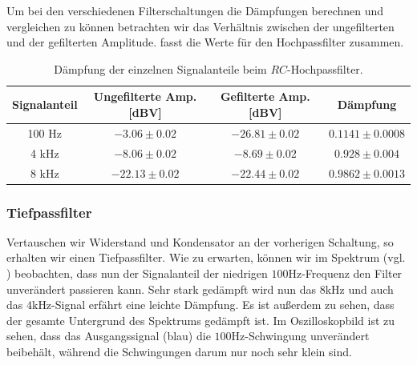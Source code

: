 Um bei den verschiedenen Filterschaltungen die Dämpfungen berechnen und vergleichen zu können betrachten wir das Verhältnis zwischen der ungefilterten und der gefilterten Amplitude.  fasst die Werte für den  Hochpassfilter zusammen.

\begin{table}[H]
  \centering
  \caption{Dämpfung der einzelnen Signalanteile beim $RC$-Hochpassfilter.}
  \vspace*{1em}
  \label{tab:dmpf_hochpass}
  \begin{tabular}{c|c|c|c}
    Signalanteil & Ungefilterte Amp. [dBV] & Gefilterte Amp. [dBV] & Dämpfung\\\hline
    100 Hz & $-3.06 \pm 0.02$ & $-26.81 \pm 0.02$ & $0.1141 \pm 0.0008$\\
    4 kHz & $-8.06 \pm 0.02$ & $-8.69 \pm 0.02$ & $0.928 \pm 0.004$\\
    8 kHz & $-22.13 \pm 0.02$ & $-22.44 \pm 0.02$ & $0.9862 \pm 0.0013$
  \end{tabular}
\end{table}



\newpage
\subsubsection*{Tiefpassfilter}

Vertauschen wir Widerstand und Kondensator an der vorherigen Schaltung, so erhalten wir einen Tiefpassfilter. Wie zu erwarten, können wir im Spektrum (vgl. ) beobachten, dass nun der Signalanteil der niedrigen $100\si{\hertz}$-Frequenz den Filter unverändert passieren kann. Sehr stark gedämpft wird nun das $8\si{\kilo\hertz}$ und auch das $4\si{\kilo\hertz}$-Signal erfährt eine leichte Dämpfung. Es ist außerdem zu sehen, dass der gesamte Untergrund des Spektrums gedämpft ist. Im Oszilloskopbild ist zu sehen, dass das Ausgangssignal (blau) die $100\si{\hertz}$-Schwingung unverändert beibehält, während die Schwingungen darum nur noch sehr klein sind.

